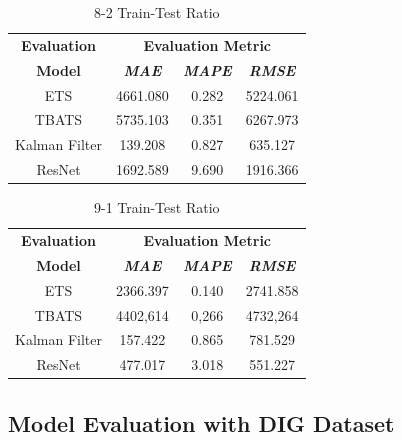 \documentclass[conference]{IEEEtran}
\begin{document}
\begin{table}[htbp]
\caption{8-2 Train-Test Ratio}
\begin{center}
\begin{tabular}{|c|c|c|c|}
\hline
\textbf{Evaluation}&\multicolumn{3}{|c|}{\textbf{Evaluation Metric}} \\
\cline{2-4}
\textbf{Model} & \textbf{\textit{MAE}}& \textbf{\textit{MAPE}}& \textbf{\textit{RMSE}} \\
\hline
ETS & 4661.080 & 0.282 & 5224.061\\
\hline
TBATS & 5735.103 & 0.351 & 6267.973\\
\hline
Kalman Filter & 139.208 & 0.827 & 635.127\\
\hline
ResNet & 1692.589 & 9.690 & 1916.366\\
\hline
\end{tabular}
\label{tab1}
\end{center}
\end{table}

\begin{table}[htbp]
\caption{9-1 Train-Test Ratio}
\begin{center}
\begin{tabular}{|c|c|c|c|}
\hline
\textbf{Evaluation}&\multicolumn{3}{|c|}{\textbf{Evaluation Metric}} \\
\cline{2-4}
\textbf{Model} & \textbf{\textit{MAE}}& \textbf{\textit{MAPE}}& \textbf{\textit{RMSE}} \\
\hline
ETS & 2366.397 & 0.140 & 2741.858\\
\hline

TBATS & 4402,614 & 0,266 & 4732,264\\
\hline
Kalman Filter & 157.422 & 0.865 & 781.529\\
\hline
ResNet & 477.017 & 3.018 & 551.227\\
\hline
\end{tabular}
\label{tab1}
\end{center}
\end{table}

\newpage

\subsection{Model Evaluation with DIG Dataset}
\end{document}
